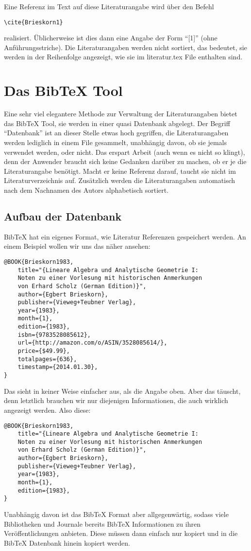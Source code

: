Eine Referenz im Text auf diese Literaturangabe wird über den Befehl
\begin{verbatim}
\cite{Brieskorn1}
\end{verbatim}
realisiert. Üblicherweise ist dies dann eine Angabe der Form "`[1]"' (ohne Anführungsstriche). Die Literaturangaben werden nicht sortiert, das bedeutet, sie werden in der Reihenfolge angezeigt, wie sie im literatur.tex File enthalten sind. 

\section{Das BibTeX Tool}

Eine sehr viel elegantere Methode zur Verwaltung der Literaturangaben bietet das BibTeX Tool, sie werden in einer quasi Datenbank abgelegt. Der Begriff "`Datenbank"' ist an dieser Stelle etwas hoch gegriffen, die Literaturangaben werden lediglich in einem File gesammelt, unabhängig davon, ob sie jemals verwendet werden, oder nicht. Das erspart Arbeit (auch wenn es nicht so klingt), denn der Anwender braucht sich keine Gedanken darüber zu machen, ob er je die Literaturangabe benötigt. Macht er keine Referenz darauf, taucht sie nicht im Literaturverzeichnis auf. Zusätzlich werden die Literaturangaben automatisch nach dem Nachnamen des Autors alphabetisch sortiert. 

\subsection{Aufbau der Datenbank}

BibTeX hat ein eigenes Format, wie Literatur Referenzen gespeichert werden. An einem Beispiel wollen wir uns das näher ansehen:
\begin{verbatim}
@BOOK{Brieskorn1983, 
	title="{Lineare Algebra und Analytische Geometrie I: 
	Noten zu einer Vorlesung mit historischen Anmerkungen 
	von Erhard Scholz (German Edition)}",
	author={Egbert Brieskorn},
	publisher={Vieweg+Teubner Verlag},
	year={1983},
	month={1},
	edition={1983},
	isbn={9783528085612},
	url={http://amazon.com/o/ASIN/3528085614/},
	price={$49.99},
	totalpages={636},
	timestamp={2014.01.30},
}
\end{verbatim}
Das sieht in keiner Weise einfacher aus, als die Angabe oben. Aber das täuscht, denn letztlich brauchen wir nur diejenigen Informationen, die auch wirklich angezeigt werden. Also diese:
\begin{verbatim}
@BOOK{Brieskorn1983, 
	title="{Lineare Algebra und Analytische Geometrie I: 
	Noten zu einer Vorlesung mit historischen Anmerkungen 
	von Erhard Scholz (German Edition)}",
	author={Egbert Brieskorn},
	publisher={Vieweg+Teubner Verlag},
	year={1983},
	month={1},
	edition={1983},
}
\end{verbatim}
Unabhängig davon ist das BibTeX Format aber allgegenwärtig, sodass viele Bibliotheken und Journale bereits BibTeX Informationen zu ihren Veröffentlichungen anbieten. Diese müssen dann einfach nur kopiert und in die BibTeX Datenbank hinein kopiert werden. 

